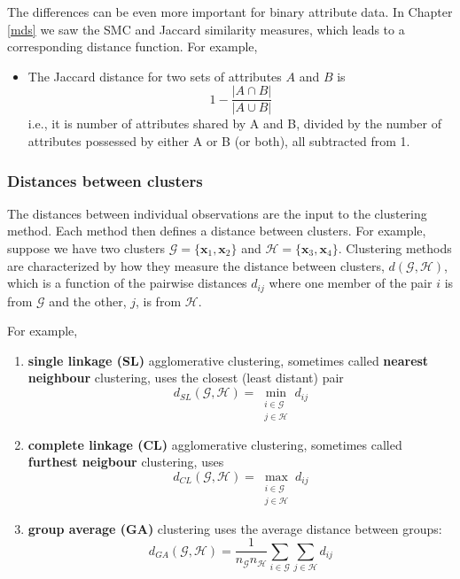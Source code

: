 \documentclass[
]{book}
\providecommand{\tightlist}{%
  \setlength{\itemsep}{0pt}\setlength{\parskip}{0pt}}
\theoremstyle{definition}
\theoremstyle{definition}
\theoremstyle{definition}
\theoremstyle{definition}
\theoremstyle{remark}
\begin{document}
The differences can be even more important for binary attribute data. In Chapter \ref{mds} we saw the SMC and Jaccard similarity measures, which leads to a corresponding distance function. For example,

\begin{itemize}
\tightlist
\item
  The Jaccard distance for two sets of attributes \(A\) and \(B\) is
  \[1- \frac{|A \cap B|}{|A\cup B|}\]
  i.e., it is number of attributes shared by A and B, divided by the number of attributes possessed by either A or B (or both), all subtracted from 1.
\end{itemize}

\subsubsection{Distances between clusters}\label{distances-between-clusters}

The distances between individual observations are the input to the clustering method. Each method then defines a distance between clusters. For example, suppose we have two clusters \(\mathcal{G}=\{\mathbf x_1, \mathbf x_2\}\) and \(\mathcal{H}=\{\mathbf x_3, \mathbf x_4\}\). Clustering methods are characterized by how they measure the distance between clusters, \(d(\mathcal{G}, \mathcal{H})\), which is a function of the pairwise distances \(d_{ij}\) where one member of the pair \(i\) is from \(\mathcal{G}\) and the other, \(j\), is from \(\mathcal{H}\).

For example,

\begin{enumerate}
\def\labelenumi{\arabic{enumi}.}
\item
  \textbf{single linkage (SL)} agglomerative clustering, sometimes called \textbf{nearest neighbour} clustering, uses the closest (least distant) pair
  \[d_{SL}(\mathcal{G}, \mathcal{H}) = \min_{\substack{i\in \mathcal{G}\\ j\in \mathcal{H}}} d_{ij}\]
\item
  \textbf{complete linkage (CL)} agglomerative clustering, sometimes called \textbf{furthest neigbour} clustering, uses
  \[d_{CL}(\mathcal{G}, \mathcal{H}) = \max_{\substack{i\in \mathcal{G}\\ j\in \mathcal{H}}} d_{ij}\]
\item
  \textbf{group average (GA)} clustering uses the average distance between groups:
  \[d_{GA}(\mathcal{G}, \mathcal{H}) = \frac{1}{n_\mathcal{G}n_\mathcal{H}}\sum_{i\in\mathcal{G}}\sum_{j\in\mathcal{H}} d_{ij}\]
\end{enumerate}
\end{document}
